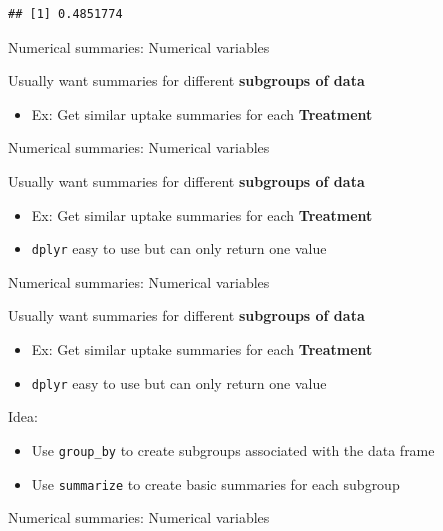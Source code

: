 \documentclass[
]{book}
\newenvironment{Shaded}{\begin{snugshade}}{\end{snugshade}}
\newcommand{\KeywordTok}[1]{\textcolor[rgb]{0.13,0.29,0.53}{\textbf{#1}}}
\newcommand{\NormalTok}[1]{#1}
\newcommand{\OperatorTok}[1]{\textcolor[rgb]{0.81,0.36,0.00}{\textbf{#1}}}
\providecommand{\tightlist}{%
  \setlength{\itemsep}{0pt}\setlength{\parskip}{0pt}}
\theoremstyle{definition}
\theoremstyle{definition}
\theoremstyle{definition}
\theoremstyle{remark}
\begin{document}
\begin{Shaded}
\end{Shaded}

\begin{verbatim}
## [1] 0.4851774
\end{verbatim}

Numerical summaries: Numerical variables

Usually want summaries for different \textbf{subgroups of data}

\begin{itemize}
\tightlist
\item
  Ex: Get similar uptake summaries for each \textbf{Treatment}
\end{itemize}

Numerical summaries: Numerical variables

Usually want summaries for different \textbf{subgroups of data}

\begin{itemize}
\item
  Ex: Get similar uptake summaries for each \textbf{Treatment}
\item
  \texttt{dplyr} easy to use but can only return one value
\end{itemize}

Numerical summaries: Numerical variables

Usually want summaries for different \textbf{subgroups of data}

\begin{itemize}
\item
  Ex: Get similar uptake summaries for each \textbf{Treatment}
\item
  \texttt{dplyr} easy to use but can only return one value
\end{itemize}

Idea:

\begin{itemize}
\item
  Use \texttt{group\_by} to create subgroups associated with the data frame
\item
  Use \texttt{summarize} to create basic summaries for each subgroup
\end{itemize}

Numerical summaries: Numerical variables
\end{document}
